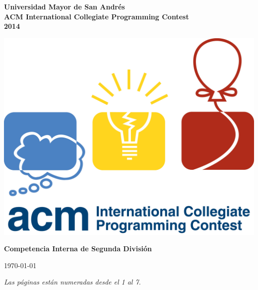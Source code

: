 \pagestyle{myheadings}


\begin{titlepage}

\begin{center}

\vspace{2.5cm}
{\large \bf Universidad Mayor de San Andr\'es}\\[12pt]
{\Large \bf ACM International Collegiate Programming Contest}\\[12pt]
{\Large \bf 2014}\\[12pt]

\vspace{0.4cm}

\includegraphics[scale=0.08]{icpclogo.jpg}

\vspace{0.4cm}

{\large \bf Competencia Interna de Segunda Divisi\'on}\\[12pt]

\begin{center}
\today
\end{center}
\vspace{0.3cm}
\emph{Las p\'aginas est\'an numeradas desde el 1 al 7.}
\vspace{0.3cm}

\tableofcontents

\end{center}
\vfill
\end{titlepage}
